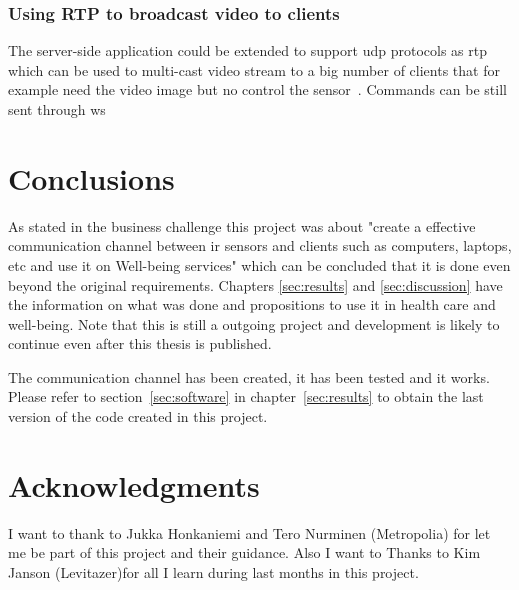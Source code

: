 \documentclass[hidelinks,11pt,a4paper,oneside,article]{memoir}
\begin{document}
\subsection{Using RTP to broadcast video to clients}
The server-side application could be extended to support \gls{udp} protocols as \gls{rtp} which can be used to multi-cast video stream to a big number of clients that for example need the video image but no control the sensor~\cite[298]{hardy2013networks}. Commands can be still sent through \gls{ws} 

\clearpage\chapter{Conclusions}
As stated in the business challenge this project was about "create a effective communication channel between ir sensors and clients such as computers, laptops, etc and use it on Well-being services" which can be concluded that it is done even beyond the original requirements. Chapters \ref{sec:results} and \ref{sec:discussion} have the information on what was done and propositions to use it in health care and well-being. Note that this is still a outgoing project and development is likely to continue even after this thesis is published.

The communication channel has been created, it has been tested and  it works. Please refer to section~\ref{sec:software} in chapter~\ref{sec:results} to obtain the last version of the code created in this project.

\clearpage\chapter{Acknowledgments}
I want to thank to Jukka Honkaniemi and Tero Nurminen (Metropolia) for let me be part of this project and their guidance. Also I want to Thanks to Kim Janson (Levitazer)for all I learn during last months in this project.




\clearpage{}
\begin{flushleft}
\begin{singlespacing}

\end{singlespacing}
\end{flushleft}
\end{document}
